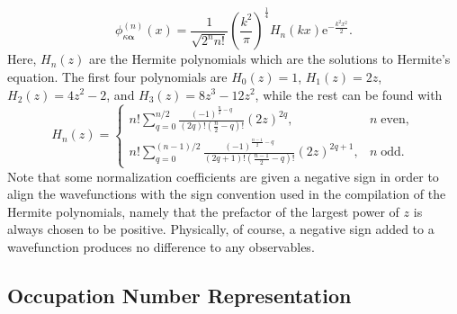\documentclass{article}
\numberwithin{equation}{section}
\begin{document}
\begin{equation}
\phi_{\kappa\bm{\alpha}}^{(n)}(x) = \frac{1}{\sqrt{2^nn!}}\left(\frac{k^2}{\pi}\right)^\frac{1}{4}H_n(kx)\mathrm{e}^{-\frac{k^2x^2}{2}}.
\end{equation}
Here, $H_n(z)$ are the Hermite polynomials which are the solutions to Hermite's equation. The first four polynomials are $H_0(z) = 1$, $H_1(z) = 2z$, $H_2(z) = 4z^2 - 2$, and $H_3(z) = 8z^3 - 12z^2$, while the rest can be found with
\begin{equation}
H_n(z) = 
\begin{cases}
\displaystyle n!\sum_{q = 0}^{n/2}\frac{(-1)^{\frac{n}{2} - q}}{(2q)!\left(\frac{n}{2} - q\right)!}(2z)^{2q},& n\;\mathrm{even},\\[1.5em]
\displaystyle n!\sum_{q = 0}^{(n-1)/2}\frac{(-1)^{\frac{n-1}{2} - q}}{(2q + 1)!\left(\frac{n-1}{2} - q\right)!}(2z)^{2q + 1},& n\;\mathrm{odd}.
\end{cases}
\end{equation}
Note that some normalization coefficients are given a negative sign in order to align the wavefunctions with the sign convention used in the compilation of the Hermite polynomials, namely that the prefactor of the largest power of $z$ is always chosen to be positive. Physically, of course, a negative sign added to a wavefunction produces no difference to any observables.















\subsection{Occupation Number Representation}
\end{document}
